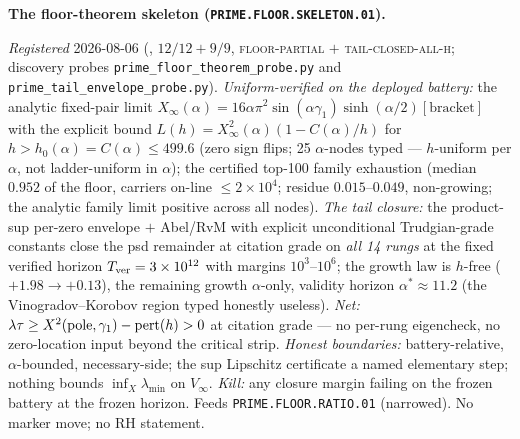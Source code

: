 \documentclass[11pt,a4paper]{article}
\begin{document}
\par\smallskip\noindent\textbf{The floor-theorem skeleton
(\texttt{PRIME.FLOOR.SKELETON.01}).}
{\sloppy
\emph{Registered} 2026-08-06
(, $12/12 + 9/9$,
\textsc{floor-partial} $+$ \textsc{tail-closed-all-h}; discovery
probes \texttt{prime\_floor\_theorem\_probe.py} and
\texttt{prime\_tail\_envelope\_probe.py}).  \emph{Uniform-verified
on the deployed battery:} the analytic fixed-pair limit
$X_\infty(\alpha) = 16\alpha\pi^2\sin(\alpha\gamma_1)
\sinh(\alpha/2)[\text{bracket}]$ with the explicit bound $L(h) =
X_\infty^2(\alpha)(1 - C(\alpha)/h)$ for $h > h_0(\alpha) =
C(\alpha)\le499.6$ (zero sign flips; 25 $\alpha$-nodes typed ---
$h$-uniform per $\alpha$, not ladder-uniform in $\alpha$); the
certified top-100 family exhaustion (median $0.952$ of the floor,
carriers on-line $\le2\times10^4$; residue $0.015$--$0.049$,
non-growing; the analytic family limit positive across all
nodes).  \emph{The tail closure:} the product-sup per-zero
envelope $+$ Abel/RvM with explicit unconditional Trudgian-grade
constants close the psd remainder at citation grade on
\emph{all 14 rungs} at the fixed verified horizon
$T_{\rm ver}=3\times10^{12}$ with margins $10^3$--$10^6$; the
growth law is $h$-free ($+1.98\to+0.13$), the remaining growth
$\alpha$-only, validity horizon $\alpha^*\approx11.2$ (the
Vinogradov--Korobov region typed honestly useless).  \emph{Net:}
$\lambda\tau\ge X^2({\rm pole},\gamma_1)-{\rm pert}(h)>0$ at
citation grade --- no per-rung eigencheck, no zero-location input
beyond the critical strip.  \emph{Honest boundaries:}
battery-relative, $\alpha$-bounded, necessary-side; the sup
Lipschitz certificate a named elementary step; nothing bounds
$\inf_X\lambda_{\min}$ on $V_\infty$.  \emph{Kill:} any closure
margin failing on the frozen battery at the frozen horizon.
Feeds \texttt{PRIME.FLOOR.RATIO.01} (narrowed).  No marker move;
no RH statement.\par}
\end{document}
